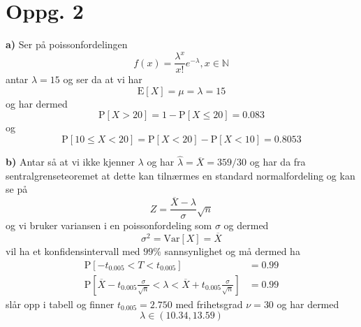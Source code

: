 \documentclass{report}
\newcommand{\M}[2]{\mathbb{#1}^{#2}}
\newcommand{\nbrack}[1]{\left( #1 \right)}
\newcommand{\bbrack}[1]{\left[ #1 \right]}
\newcommand{\Var}[1]{\text{Var} \bbrack{ #1 }}
\newcommand{\std}[1]{\text{E} \bbrack{ #1 }}
\newcommand{\Prob}[1]{\text{P} \bbrack{ #1 }}
\begin{document}
\section*{Oppg. 2}
\textbf{a)}
Ser på poissonfordelingen
\begin{equation}
  \label{eq:6}
  f(x) = \frac{\lambda^{x}}{x!} e^{-\lambda}, x\in \M{N}{}
\end{equation}
antar $\lambda = 15$ og ser da at vi har
\begin{equation}
  \label{eq:7}
  \std{X} = \mu = \lambda = 15
\end{equation}
og har dermed
\begin{equation}
  \label{eq:8}
  \Prob{X>20} = 1 - \Prob{X\leq 20} = 0.083
\end{equation}
og
\begin{equation}
  \label{eq:9}
  \Prob{10\leq X < 20} = \Prob{X<20} - \Prob{X < 10} = 0.8053
\end{equation}

\textbf{b)}
Antar så at vi ikke kjenner $\lambda$ og har $\hat{\lambda} = \overline{X} = 359/30$ og har da fra sentralgrenseteoremet at dette kan tilnærmes en standard normalfordeling og kan se på
\begin{equation}
  \label{eq:10}
  Z = \frac{\overline{X} - \lambda}{\sigma}\sqrt{n}
\end{equation}
og vi bruker variansen i en poissonfordeling som $\sigma$ og dermed
\begin{equation}
  \label{eq:13}
  \sigma^{2} = \Var{X} = \overline{X}
\end{equation}
vil ha et konfidensintervall med $99\%$ sannsynlighet og må dermed ha
\begin{equation}
  \label{eq:11}
  \begin{split}
    \Prob{ -t_{0.005} < T < t_{0.005} } &= 0.99 \\
    \Prob{ \overline{X} - t_{0.005} \frac{\sigma}{\sqrt{n}} < \lambda < \overline{X} + t_{0.005} \frac{\sigma}{\sqrt{n}} } &= 0.99
  \end{split}
\end{equation}
slår opp i tabell og finner $t_{0.005} = 2.750$ med frihetsgrad $\nu = 30$ og har dermed
\begin{equation}
  \label{eq:12}
  \lambda \in \nbrack{10.34, 13.59}
\end{equation}
\end{document}
